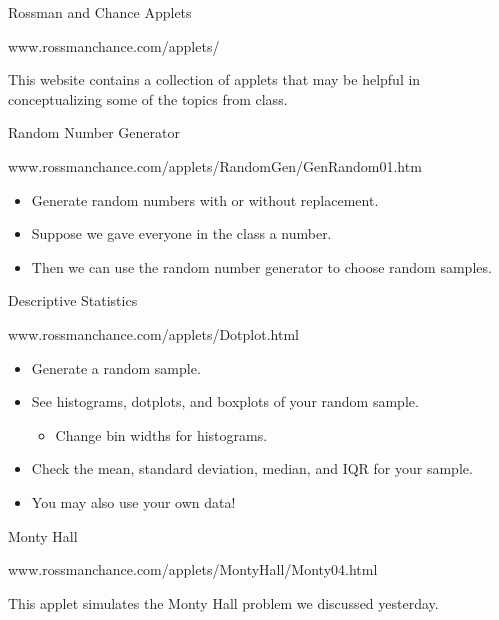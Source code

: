 \begin{frame}{Rossman and Chance Applets}
    \begin{center}
        www.rossmanchance.com/applets/
    \end{center}
    \vspace{12pt}This website contains a collection of applets that may be helpful in conceptualizing some of the topics from class.
\end{frame}

\begin{frame}{Random Number Generator}
    \begin{center}
        www.rossmanchance.com/applets/RandomGen/GenRandom01.htm
    \end{center}
    \vspace{12pt}\begin{itemize}
        \item Generate random numbers with or without replacement.
        \item Suppose we gave everyone in the class a number.
        \item Then we can use the random number generator to choose random samples.
    \end{itemize}
\end{frame}

\begin{frame}{Descriptive Statistics}
    \begin{center}
        www.rossmanchance.com/applets/Dotplot.html
    \end{center}
    \vspace{12pt}\begin{itemize}
        \item Generate a random sample.
        \item See histograms, dotplots, and boxplots of your random sample.
        \begin{itemize}
            \item Change bin widths for histograms.
        \end{itemize}
        \item Check the mean, standard deviation, median, and IQR for your sample.
        \item You may also use your own data!
    \end{itemize}
\end{frame}

\begin{frame}{Monty Hall}
    \begin{center}
        www.rossmanchance.com/applets/MontyHall/Monty04.html
    \end{center}
    \vspace{12pt}This applet simulates the Monty Hall problem we discussed yesterday.
\end{frame}

